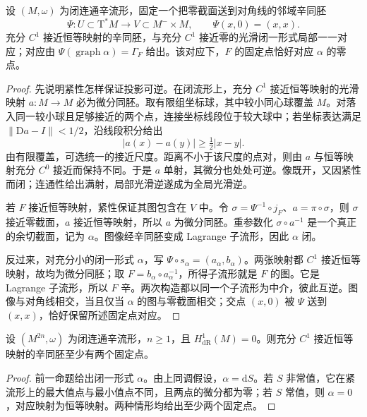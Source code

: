 \begin{proposition}\label{g4:prop:0804:near-identity-forms}
	设 \((M,\omega)\) 为闭连通辛流形，固定一个把零截面送到对角线的邻域辛同胚
	\[
		\Psi:U\subset\mathrm{T}^*M\longrightarrow V\subset M^-\times M,
		\qquad \Psi(x,0)=(x,x).
	\]
	充分 \(C^1\) 接近恒等映射的辛同胚，与充分 \(C^1\) 接近零的光滑闭一形式局部一一对应；对应由 \(\Psi(\operatorname{graph}\alpha)=\Gamma_F\) 给出。该对应下，\(F\) 的固定点恰好对应 \(\alpha\) 的零点。
\end{proposition}
\begin{proof}
	先说明紧性怎样保证投影可逆。在闭流形上，充分 \(C^1\) 接近恒等映射的光滑映射 \(a:M\to M\) 必为微分同胚。取有限组坐标球，其中较小同心球覆盖 \(M\)。对落入同一较小球且足够接近的两个点，连接坐标线段位于较大球中；若坐标表达满足 \(\|\mathrm{D}a-I\|<1/2\)，沿线段积分给出
	\[
		|a(x)-a(y)|\ge\tfrac12|x-y|.
	\]
	由有限覆盖，可选统一的接近尺度。距离不小于该尺度的点对，则由 \(a\) 与恒等映射充分 \(C^0\) 接近而保持不同。于是 \(a\) 单射，其微分也处处可逆。像既开，又因紧性而闭；连通性给出满射，局部光滑逆遂成为全局光滑逆。

	若 \(F\) 接近恒等映射，紧性保证其图包含在 \(V\) 中。令 \(\sigma=\Psi^{-1}\circ j_F\)、\(a=\pi\circ\sigma\)，则 \(\sigma\) 接近零截面，\(a\) 接近恒等映射，所以 \(a\) 为微分同胚。重参数化 \(\sigma\circ a^{-1}\) 是一个真正的余切截面，记为 \(\alpha\)。图像经辛同胚变成 Lagrange 子流形，因此 \(\alpha\) 闭。

	反过来，对充分小的闭一形式 \(\alpha\)，写 \(\Psi\circ s_\alpha=(a_\alpha,b_\alpha)\)。两张映射都 \(C^1\) 接近恒等映射，故均为微分同胚；取 \(F=b_\alpha\circ a_\alpha^{-1}\)，所得子流形就是 \(F\) 的图。它是 Lagrange 子流形，所以 \(F\) 辛。两次构造都以同一个子流形为中介，彼此互逆。图像与对角线相交，当且仅当 \(\alpha\) 的图与零截面相交；交点 \((x,0)\) 被 \(\Psi\) 送到 \((x,x)\)，恰好保留所述固定点对应。
\end{proof}

\begin{corollary}\label{g4:cor:0804:near-identity-fixed-points}
	设 \((M^{2n},\omega)\) 为闭连通辛流形，\(n\ge1\)，且 \(H^1_{\mathrm{dR}}(M)=0\)。则充分 \(C^1\) 接近恒等映射的辛同胚至少有两个固定点。
\end{corollary}
\begin{proof}
	前一命题给出闭一形式 \(\alpha\)。由上同调假设，\(\alpha=\mathrm{d}S\)。若 \(S\) 非常值，它在紧流形上的最大值点与最小值点不同，且两点的微分都为零；若 \(S\) 常值，则 \(\alpha=0\)，对应映射为恒等映射。两种情形均给出至少两个固定点。
\end{proof}


